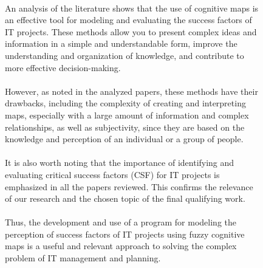 \documentclass{article}
\begin{document}
    \begin{figure}[!t]
        \fontsize{8}{7}\selectfont
        \begin{minipage}{0.49\textwidth}
            ~\\
            An analysis of the literature shows that the use of cognitive maps is an effective tool for modeling and evaluating the success factors of IT projects. These methods allow you to present complex ideas and information in a simple and understandable form, improve the understanding and organization of knowledge, and contribute to more effective decision-making.\\
            ~\\
            However, as noted in the analyzed papers, these methods have their drawbacks, including the complexity of creating and interpreting maps, especially with a large amount of information and complex relationships, as well as subjectivity, since they are based on the knowledge and perception of an individual or a group of people.\\
            ~\\
            It is also worth noting that the importance of identifying and evaluating critical success factors (CSF) for IT projects is emphasized in all the papers reviewed. This confirms the relevance of our research and the chosen topic of the final qualifying work.\\
            ~\\
            Thus, the development and use of a program for modeling the perception of success factors of IT projects using fuzzy cognitive maps is a useful and relevant approach to solving the complex problem of IT management and planning.\\
            \begin{center}

\end{center}
\end{minipage}
\end{figure}
\end{document}
